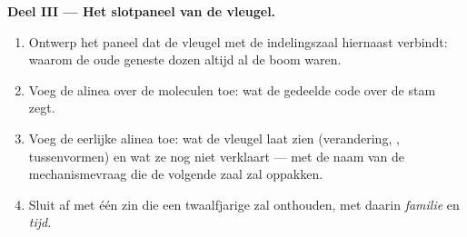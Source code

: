 \begin{problem}
\medskip\noindent\textbf{Deel III --- Het slotpaneel van de
vleugel.}
\begin{enumerate}[resume]
  \item Ontwerp het paneel dat de vleugel met de indelingszaal
        hiernaast verbindt: waarom de oude geneste dozen altijd
        al de boom waren.
  \item Voeg de alinea over de moleculen toe: wat de gedeelde
        code over de stam zegt.
  \item Voeg de eerlijke alinea toe: wat de vleugel laat zien
        (verandering, , tussenvormen) en wat ze nog
        niet verklaart --- met de naam van de mechanismevraag die
        de volgende zaal zal oppakken.
  \item Sluit af met één zin die een twaalfjarige zal onthouden,
        met daarin \emph{familie} en
        \emph{tijd}.
\end{enumerate}
\end{problem}
